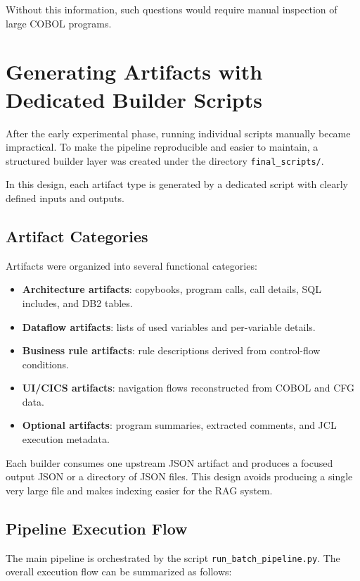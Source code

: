 \documentclass[11pt]{article}
\begin{document}
Without this information, such questions would require manual inspection of large COBOL programs.

\newpage

\section{Generating Artifacts with Dedicated Builder Scripts}
\label{sec:builders}

After the early experimental phase, running individual scripts manually became impractical. To make the pipeline reproducible and easier to maintain, a structured builder layer was created under the directory \texttt{final\_scripts/}.

In this design, each artifact type is generated by a dedicated script with clearly defined inputs and outputs.

\subsection*{Artifact Categories}

Artifacts were organized into several functional categories:

\begin{itemize}
\item \textbf{Architecture artifacts}: copybooks, program calls, call details, SQL includes, and DB2 tables.
\item \textbf{Dataflow artifacts}: lists of used variables and per-variable details.
\item \textbf{Business rule artifacts}: rule descriptions derived from control-flow conditions.
\item \textbf{UI/CICS artifacts}: navigation flows reconstructed from COBOL and CFG data.
\item \textbf{Optional artifacts}: program summaries, extracted comments, and JCL execution metadata.
\end{itemize}

Each builder consumes one upstream JSON artifact and produces a focused output JSON or a directory of JSON files. This design avoids producing a single very large file and makes indexing easier for the RAG system.

\subsection*{Pipeline Execution Flow}

The main pipeline is orchestrated by the script \texttt{run\_batch\_pipeline.py}. The overall execution flow can be summarized as follows:
\end{document}
